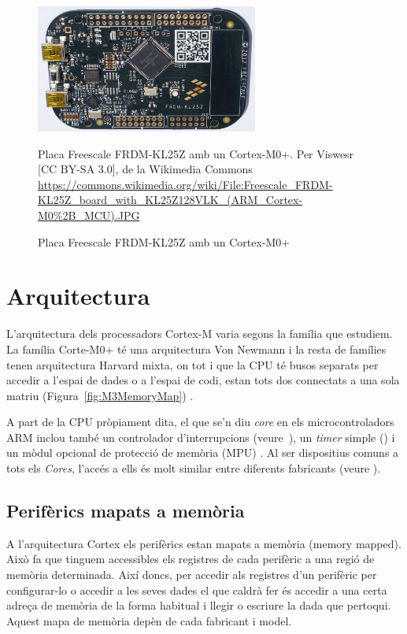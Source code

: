 \begin{figure}
 \centering
 \includegraphics[width=0.65\textwidth, keepaspectratio]{imatges/Freescale_FRDM-KL25Z}
 \caption{Placa Freescale FRDM-KL25Z amb un Cortex-M0+}{Placa Freescale FRDM-KL25Z amb un Cortex-M0+. Per Viswesr [CC BY-SA 3.0], de la Wikimedia Commons \url{https://commons.wikimedia.org/wiki/File:Freescale_FRDM-KL25Z_board_with_KL25Z128VLK_(ARM_Cortex-M0\%2B_MCU).JPG}}
 \label{fig:FRDM}
\end{figure}


\section{Arquitectura}
\label{se:arquitectura}
L'arquitectura dels processadors Cortex-M varia segons la família que estudiem. La família Corte-M0+ té una arquitectura Von Newmann i la resta de famílies tenen arquitectura Harvard mixta, on tot i que la CPU té busos separats per accedir a l'espai de dades o a l'espai de codi, estan tots dos connectats a una sola matriu (Figura~\ref{fig:M3MemoryMap}) \cite[794]{GuideCortexM3M4}.

A part de la CPU pròpiament dita, el que se'n diu {\em core} en els microcontroladors ARM inclou també un controlador d'interrupcions (veure~), un {\em timer} simple () i un mòdul opcional de protecció de memòria (MPU) \cite[230]{GuideCortexM3M4}. Al ser dispositius comuns a tots els {\em Cores}, l'accés a ells és molt similar entre diferents fabricants (veure ).

\subsection{Perifèrics mapats a memòria}
\label{sub:memory-mapped}
A l'arquitectura Cortex els perifèrics estan mapats a memòria (\gls{memory mapped}). Això fa que tinguem accessibles els registres de cada perifèric a una regió de memòria determinada. Així doncs, per accedir als registres d'un perifèric per configurar-lo o accedir a les seves dades el que caldrà fer és accedir a una certa adreça de memòria de la forma habitual i llegir o escriure la dada que pertoqui. Aquest mapa de memòria depèn de cada fabricant i model.

